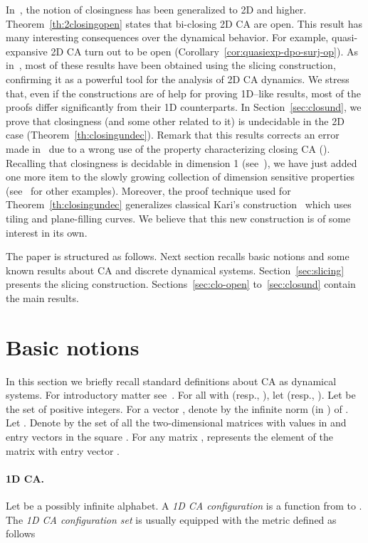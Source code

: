 \documentclass{llncs}
\begin{document}
In~\cite{dennunzio08}, the notion of closingness has been generalized to 2D and higher. Theorem~\ref{th:2closingopen} states that
bi-closing 2D CA are open. This result has many interesting consequences over the dynamical behavior. For example, quasi-expansive 2D CA turn out to be open 
(Corollary~\ref{cor:quasiexp-dpo-surj-op}). As in~\cite{dennunzio08}, most of these results have been obtained
using the slicing construction, confirming it as a powerful tool for the analysis of 2D CA dynamics. We stress that, even if the constructions are of help for
proving 1D--like results, most of the proofs differ significantly from their 1D
counterparts.
In Section~\ref{sec:closund}, we prove that closingness (and some other related to it) is undecidable in the 2D case (Theorem~\ref{th:closingundec}). Remark that this results corrects an error
made in~\cite[Prop. ]{dennunzio08} due to a wrong use of the property characterizing closing CA (\cite[Prop. ]{dennunzio08}). Recalling that closingness is decidable in
dimension 1 (see~\cite{kurka04}), we have just added one more
item to the slowly growing collection of dimension sensitive properties
(see~\cite{kari94a,bernardi05} for other examples). 
Moreover, the proof technique used for Theorem~\ref{th:closingundec}
generalizes classical Kari's construction~\cite{kari94a} which uses tiling and plane-filling curves. We believe that this new construction is of some interest in its own.
\smallskip

The paper is structured as follows. Next section recalls basic notions and some known results about CA and discrete dynamical systems.
Section~\ref{sec:slicing} presents the slicing construction. 
Sections~\ref{sec:clo-open} to~\ref{sec:closund} contain the main results.






\section{Basic notions}
In this section we briefly recall standard definitions about CA as
dynamical systems. For introductory matter see~\cite{kurka04}.
For all  with  (resp., ), let
 (resp., ). 
Let  be the set of positive
integers. For a vector , denote by  the
infinite norm (in ) of . Let . Denote by 
the set of all the two-dimensional matrices with values in  and
entry vectors in the square . For any matrix ,
 represents the element of the matrix with entry
vector .
\paragraph{{\bf 1D CA.}} Let  be a possibly infinite alphabet. A \emph{1D CA
configuration} is a function from  to . The \emph{1D CA
configuration set}  is usually equipped with the metric 
defined as follows
\end{document}

